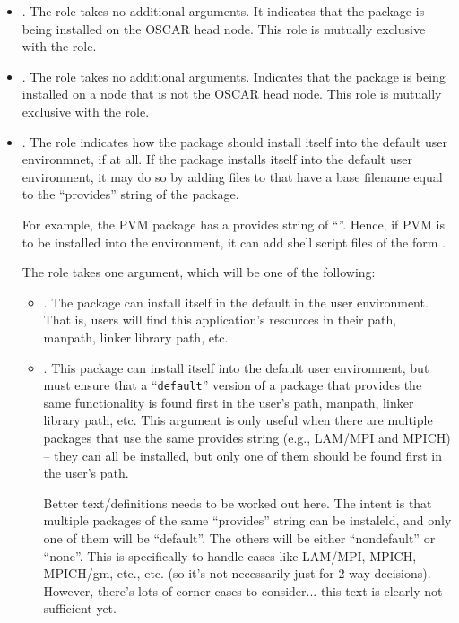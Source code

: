 \begin{itemize}
  
\item {}.  The  role takes no additional
  arguments.  It indicates that the package is being installed on the
  OSCAR head node.  This role is mutually exclusive with the
   role.
  
\item {}.  The  role takes no additional
  arguments.  Indicates that the package is being installed on a node
  that is not the OSCAR head node.  This role is mutually exclusive
  with the  role.
  
\item {}.  The  role indicates how the package should
  install itself into the default user environmnet, if at all.  If the
  package installs itself into the default user environment, it may do
  so by adding files to  that have a base
  filename equal to the ``provides'' string of the package.
  
  For example, the PVM package has a provides string of ``''.
  Hence, if PVM is to be installed into the environment, it can add
  shell script files of the form .
  
  The  role takes one argument, which will be one of the
  following:

  \begin{itemize}
  \item {}.  The package can install itself in the default
    in the user environment.  That is, users will find this
    application's resources in their path, manpath, linker library
    path, etc.
    
  \item {}.  This package can install itself into the
    default user environment, but must ensure that a ``{\tt default}''
    version of a package that provides the same functionality is found
    first in the user's path, manpath, linker library path, etc.  This
    argument is only useful when there are multiple packages that use
    the same provides string (e.g., LAM/MPI and MPICH) -- they can all
    be installed, but only one of them should be found first in the
    user's path.

    \begin{discuss}
      Better text/definitions needs to be worked out here.  The intent
      is that multiple packages of the same ``provides'' string can be
      instaleld, and only one of them will be ``default''.  The others
      will be either ``nondefault'' or ``none''.  This is specifically
      to handle cases like LAM/MPI, MPICH, MPICH/gm, etc., etc. (so
      it's not necessarily just for 2-way decisions).  However,
      there's lots of corner cases to consider... this text is clearly
      not sufficient yet.
    \end{discuss}


\end{itemize}
\end{itemize}

